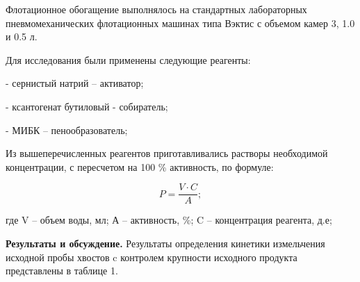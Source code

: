 \begin{multicols}{2}
Флотационное обогащение выполнялось на стандартных лабораторных
пневмомеханических флотационных машинах типа Вэктис с объемом камер 3,
1.0 и 0.5 л.

Для исследования были применены следующие реагенты:

- сернистый натрий -- активатор;

- ксантогенат бутиловый - собиратель;

- МИБК -- пенообразователь;

Из вышеперечисленных реагентов приготавливались растворы необходимой
концентрации, с пересчетом на 100 \% активность, по формуле:

\[P = \frac{V \cdot C}{A};\]

где V -- объем воды, мл; А -- активность, \%; C -- концентрация
реагента, д.е;

{\bfseries Результаты и обсуждение.} Результаты определения кинетики
измельчения исходной пробы хвостов c контролем крупности исходного
продукта представлены в таблице 1.
\end{multicols}

